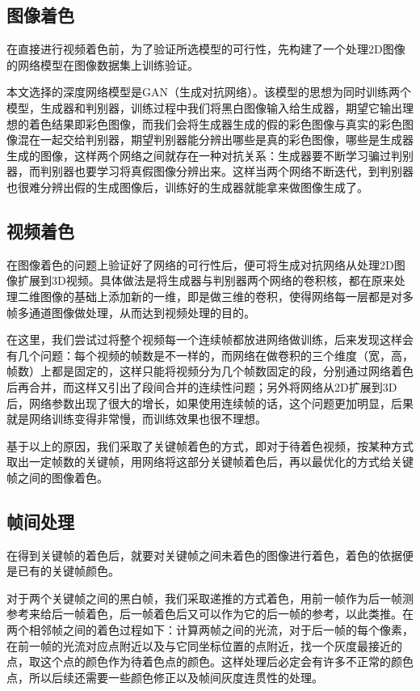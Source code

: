 \subsection{图像着色}
\label{sec:1-image-color}

  在直接进行视频着色前，为了验证所选模型的可行性，先构建了一个处理2D图像的网络模型在图像数据集上训练验证。

  本文选择的深度网络模型是GAN（生成对抗网络）。该模型的思想为同时训练两个模型，生成器和判别器，训练过程中我们将黑白图像输入给生成器，期望它输出理想的着色结果即彩色图像，而我们会将生成器生成的假的彩色图像与真实的彩色图像混在一起交给判别器，期望判别器能分辨出哪些是真的彩色图像，哪些是生成器生成的图像，这样两个网络之间就存在一种对抗关系：生成器要不断学习骗过判别器，而判别器也要学习将真假图像分辨出来。这样当两个网络不断迭代，到判别器也很难分辨出假的生成图像后，训练好的生成器就能拿来做图像生成了。

\subsection{视频着色}
\label{sec:1-video-color}

  在图像着色的问题上验证好了网络的可行性后，便可将生成对抗网络从处理2D图像扩展到3D视频。具体做法是将生成器与判别器两个网络的卷积核，都在原来处理二维图像的基础上添加新的一维，即是做三维的卷积，使得网络每一层都是对多帧多通道图像做处理，从而达到视频处理的目的。

  在这里，我们尝试过将整个视频每一个连续帧都放进网络做训练，后来发现这样会有几个问题：每个视频的帧数是不一样的，而网络在做卷积的三个维度（宽，高，帧数）上都是固定的，这样只能将视频分为几个帧数固定的段，分别通过网络着色后再合并，而这样又引出了段间合并的连续性问题；另外将网络从2D扩展到3D后，网络参数出现了很大的增长，如果使用连续帧的话，这个问题更加明显，后果就是网络训练变得非常慢，而训练效果也很不理想。

  基于以上的原因，我们采取了关键帧着色的方式，即对于待着色视频，按某种方式取出一定帧数的关键帧，用网络将这部分关键帧着色后，再以最优化的方式给关键帧之间的图像着色。

\subsection{帧间处理}
\label{sec:1-interframes}

  在得到关键帧的着色后，就要对关键帧之间未着色的图像进行着色，着色的依据便是已有的关键帧颜色。

  对于两个关键帧之间的黑白帧，我们采取递推的方式着色，用前一帧作为后一帧测参考来给后一帧着色，后一帧着色后又可以作为它的后一帧的参考，以此类推。在两个相邻帧之间的着色过程如下：计算两帧之间的光流，对于后一帧的每个像素，在前一帧的光流对应点附近以及与它同坐标位置的点附近，找一个灰度最接近的点，取这个点的颜色作为待着色点的颜色。这样处理后必定会有许多不正常的颜色点，所以后续还需要一些颜色修正以及帧间灰度连贯性的处理。

